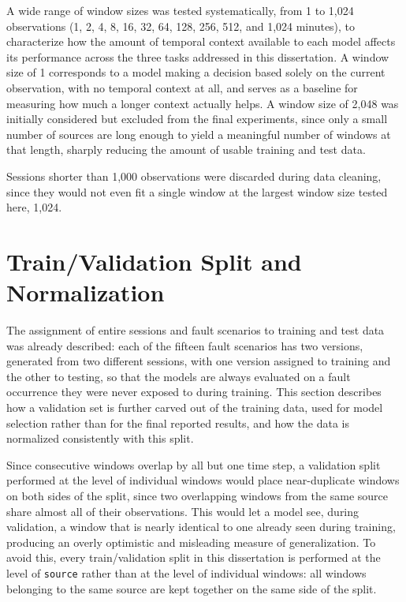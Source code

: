 A wide range of window sizes was tested systematically, from 1 to 1{,}024 observations 
(1, 2, 4, 8, 16, 32, 64, 128, 256, 512, and 1{,}024 minutes), to characterize how the amount of temporal 
context available to each model affects its performance across the three tasks addressed in this 
dissertation. A window size of 1 corresponds to a model making a decision based solely on the current 
observation, with no temporal context at all, and serves as a baseline for measuring how much a longer context actually helps. 
A window size of 2{,}048 was initially considered but excluded from the 
final experiments, since only a small number of sources are long enough to yield a meaningful number of 
windows at that length, sharply reducing the amount of usable training and test data.

Sessions shorter than 1{,}000 observations were discarded during data cleaning, 
since they would not even fit a single window at the largest window size tested here, 1{,}024.

\section{Train/Validation Split and Normalization} \label{sec:data_split}

The assignment of entire sessions and fault scenarios to training and test data was already described: 
each of the fifteen fault scenarios has two versions, generated 
from two different sessions, with one version assigned to training and the other to testing, so that the 
models are always evaluated on a fault occurrence they were never exposed to during training. This 
section describes how a validation set is further carved out of the training data, used for model 
selection rather than for the final reported results, and how the data is normalized consistently with 
this split.

Since consecutive windows overlap by all but one time step, a validation 
split performed at the level of individual windows would place near-duplicate windows on both sides of 
the split, since two overlapping windows from the same source share almost all of their observations. 
This would let a model see, during validation, a window that is nearly identical to one already seen 
during training, producing an overly optimistic and misleading measure of generalization. To avoid this, 
every train/validation split in this dissertation is performed at the level of \texttt{source} rather than 
at the level of individual windows: all windows belonging to the same source are kept together on the same 
side of the split.

